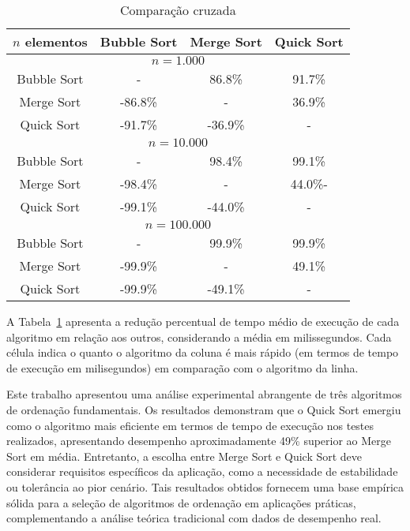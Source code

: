 \documentclass[12pt]{article}
\begin{document}
\begin{table}[h!]
\centering
\caption{Comparação cruzada}
\label{tab:comparacao_cruzada}
\begin{tabular}{|c|c|c|c|}

\hline
\textbf{$n$ elementos} & \textbf{Bubble Sort} & \textbf{Merge Sort} & \textbf{Quick Sort} \\ \hline
\multicolumn{4}{|c|}{$n = 1.000$} \\ \hline
Bubble Sort & - & 86.8\% & 91.7\% \\ 
Merge Sort & -86.8\% & - & 36.9\% \\ 
Quick Sort & -91.7\% & -36.9\% & - \\ \hline
\multicolumn{4}{|c|}{$n = 10.000$} \\ \hline
Bubble Sort & - & 98.4\% & 99.1\% \\ 
Merge Sort & -98.4\% & - & 44.0\%- \\ 
Quick Sort & -99.1\% & -44.0\% & - \\ \hline
\multicolumn{4}{|c|}{$n = 100.000$} \\ \hline
Bubble Sort & - & 99.9\% & 99.9\% \\ 
Merge Sort & -99.9\% & - & 49.1\% \\ 
Quick Sort & -99.9\% & -49.1\% & - \\ \hline
\end{tabular}
\end{table}

A Tabela~\ref{tab:comparacao_cruzada} apresenta a redução percentual de tempo médio de execução de cada algoritmo em relação aos outros, considerando a média em milissegundos. Cada célula indica o quanto o algoritmo da coluna é mais rápido (em termos de tempo de execução em milisegundos) em comparação com o algoritmo da linha.

Este trabalho apresentou uma análise experimental abrangente de três algoritmos de ordenação fundamentais. Os resultados demonstram que o Quick Sort emergiu como o algoritmo mais eficiente em termos de tempo de execução nos testes realizados, apresentando desempenho aproximadamente 49\% superior ao Merge Sort em média. Entretanto, a escolha entre Merge Sort e Quick Sort deve considerar requisitos específicos da aplicação, como a necessidade de estabilidade ou tolerância ao pior cenário. Tais resultados obtidos fornecem uma base empírica sólida para a seleção de algoritmos de ordenação em aplicações práticas, complementando a análise teórica tradicional com dados de desempenho real.



\end{document}
